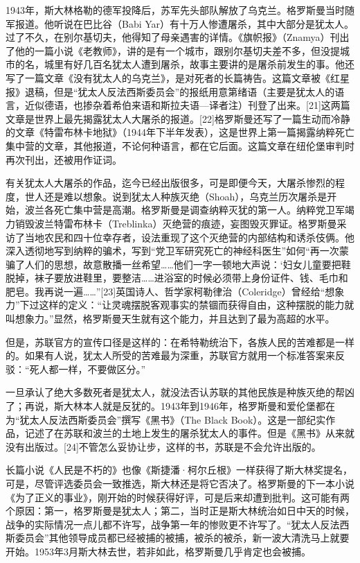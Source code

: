 1943年，斯大林格勒的德军投降后，苏军先头部队解放了乌克兰。格罗斯曼当时随军报道。他听说在巴比谷（Babi Yar）有十万人惨遭屠杀，其中大部分是犹太人。过了不久，在别尔基切夫，他得知了母亲遇害的详情。《旗帜报》（Znamya）刊出了他的一篇小说《老教师》，讲的是有一个城市，跟别尔基切夫差不多，但没提城市的名，城里有好几百名犹太人遭到屠杀，故事主要讲的是屠杀前发生的事。他还写了一篇文章《没有犹太人的乌克兰》，是对死者的长篇祷告。这篇文章被《红星报》退稿，但是“犹太人反法西斯委员会”的报纸用意第绪语（主要是犹太人的语言，近似德语，也掺杂着希伯来语和斯拉夫语—译者注）刊登了出来。[21]这两篇文章是世界上最先揭露犹太人大屠杀的报道。[22]格罗斯曼还写了一篇生动而冷静的文章《特雷布林卡地狱》（1944年下半年发表），这是世界上第一篇揭露纳粹死亡集中营的文章，其他报道，不论何种语言，都在它后面。这篇文章在纽伦堡审判时再次刊出，还被用作证词。

有关犹太人大屠杀的作品，迄今已经出版很多，可是即便今天，大屠杀惨烈的程度，世人还是难以想象。说到犹太人种族灭绝（Shoah），乌克兰历次屠杀是开始，波兰各死亡集中营是高潮。格罗斯曼是调查纳粹灭犹的第一人。纳粹党卫军竭力销毁波兰特雷布林卡（Treblinka）灭绝营的痕迹，妄图毁灭罪证。格罗斯曼采访了当地农民和四十位幸存者，设法重现了这个灭绝营的内部结构和诱杀伎俩。他深入透彻地写到纳粹的骗术，写到“党卫军研究死亡的神经科医生”如何“再一次蒙骗了人们的思想，故意散播一丝希望……他们一字一顿地大声说：‘妇女儿童要把鞋脱掉，袜子要放进鞋里，要整洁……进浴室的时候必须带上身份证件、钱、毛巾和肥皂。我再说一遍……”[23]英国诗人、哲学家柯勒律治（Coleridge）曾经给“想象力”下过这样的定义：“让灵魂摆脱客观事实的禁锢而获得自由，这种摆脱的能力就叫想象力。”显然，格罗斯曼天生就有这个能力，并且达到了最为高超的水平。

但是，苏联官方的宣传口径是这样的：在希特勒统治下，各族人民的苦难都是一样的。如果有人说，犹太人所受的苦难最为深重，苏联官方就用一个标准答案来反驳：“死人都一样，不要做区分。”

一旦承认了绝大多数死者是犹太人，就没法否认苏联的其他民族是种族灭绝的帮凶了；再说，斯大林本人就是反犹的。1943年到1946年，格罗斯曼和爱伦堡都在为“犹太人反法西斯委员会”撰写《黑书》（The Black Book）。这是一部纪实作品，记述了在苏联和波兰的土地上发生的屠杀犹太人的事件。但是《黑书》从来就没有出版过。[24]不管怎么妥协让步，这样的书，苏联是不会允许出版的。

长篇小说《人民是不朽的》也像《斯捷潘·柯尔丘根》一样获得了斯大林奖提名，可是，尽管评选委员会一致推选，斯大林还是将它否决了。格罗斯曼的下一本小说《为了正义的事业》，刚开始的时候获得好评，可是后来却遭到批判。这可能有两个原因：第一，格罗斯曼是犹太人；第二，当时正是斯大林统治如日中天的时候，战争的实际情况一点儿都不许写，战争第一年的惨败更不许写了。“犹太人反法西斯委员会”其他领导成员都已经被捕的被捕，被杀的被杀，新一波大清洗马上就要开始。1953年3月斯大林去世，若非如此，格罗斯曼几乎肯定也会被捕。

